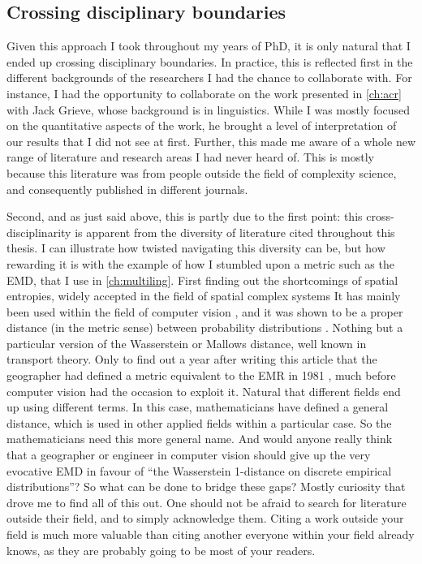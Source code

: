 \documentclass[../thesis.tex]{subfiles}
\begin{document}
\subsection{Crossing disciplinary boundaries}
Given this approach I took throughout my years of PhD, it is only natural that I ended
up crossing disciplinary boundaries. In practice, this is reflected first in the
different backgrounds of the researchers I had the chance to collaborate with. For
instance, I had the opportunity to collaborate on the work presented in \cref{ch:acr}
with Jack Grieve, whose background is in linguistics. While I was mostly focused on the
quantitative aspects of the work, he brought a level of interpretation of our results
that I did not see at first. Further, this made me aware of a whole new range of
literature and research areas I had never heard of. This is mostly because this
literature was from people outside the field of complexity science, and consequently
published in different journals.

Second, and as just said above, this is partly due to the first point: this
cross-disciplinarity is apparent from the diversity of literature cited throughout this
thesis. I can illustrate how twisted navigating this diversity can be, but how rewarding
it is with the example of how I stumbled upon a metric such as the \ac{EMD}, that I use
in \cref{ch:multiling}.
First finding out the shortcomings of spatial entropies, widely accepted in the field of
spatial complex systems \cite{BattyEntropyComplexity2014} It has mainly been used within
the field of computer vision \cite{RubnerMetricDistributions1998}, and it was shown to
be a proper distance (in the metric sense) between probability distributions
\cite{LevinaEarthMover2001}. Nothing but a particular version of the Wasserstein or
Mallows distance, well known in transport theory. Only to find out a year after writing
this article that the geographer
 had defined a metric equivalent
to the \ac{EMR} in 1981 \cite{JakubsDistancebasedSegregation1981}, much before computer
vision had the occasion to exploit it. Natural that different fields end up using
different terms. In this case, mathematicians have defined a general distance, which is
used in other applied fields within a particular case. So the mathematicians need this
more general name. And would anyone really think that a geographer or engineer in
computer vision should give up the very evocative \ac{EMD} in favour of ``the
Wasserstein 1-distance on discrete empirical distributions''? So what can be done to
bridge these gaps? Mostly curiosity that drove me to find all of this out. One should
not be afraid to search for literature outside their field, and to simply acknowledge
them. Citing a work outside your field is much more valuable than citing another
everyone within your field already knows, as they are probably going to be most of your
readers.
\end{document}
